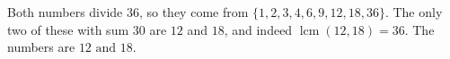 Both numbers divide $36$, so they come from $\{1,2,3,4,6,9,12,18,36\}$. The only two of these with sum $30$ are $12$ and $18$, and indeed $\operatorname{lcm}(12,18)=36$. The numbers are $\boxed{12\text{ and }18}$.
